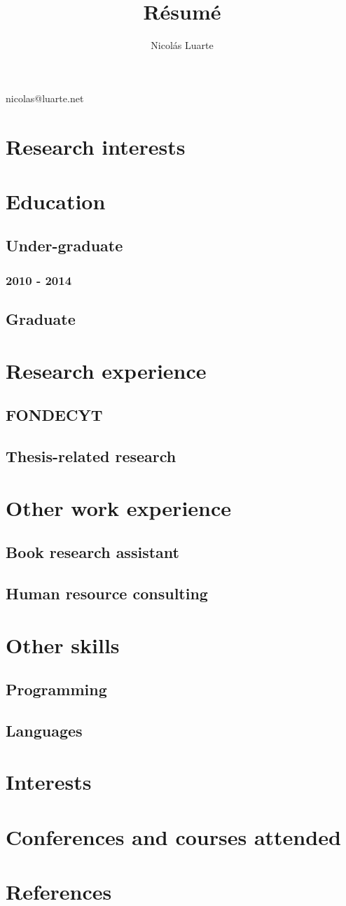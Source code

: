 \documentclass{article}
\makeatletter
\renewcommand{\maketitle}{
\begin{center}
{\huge\bfseries
\theauthor}

\vspace{.25em}

nicolas@luarte.net

\end{center}
}
\makeatother
\begin{document}
\title{R\'esum\'e}
\author{Nicol\'as Luarte}


\maketitle
\section{Research interests}
\blindtext
\section{Education}
\subsection{Under-graduate}
\subsubsection{2010 -  2014}
\blindtext
\subsection{Graduate}
\blindtext
\section{Research experience}
\blindtext
\subsection{FONDECYT}
\blindtext
\subsection{Thesis-related research}
\blindtext
\section{Other work experience}
\blindtext
\subsection{Book research assistant}
\blindtext
\subsection{Human resource consulting}
\blindtext  
\section{Other skills}
\blindtext
\subsection{Programming}
\blindtext
\subsection{Languages}
\blindtext
\section{Interests}
\blindtext
\section{Conferences and courses attended}
\blindtext
\section{References}
\blindtext
\end{document}

